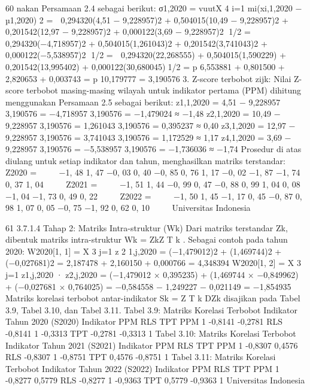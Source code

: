 60
nakan Persamaan 2.4 sebagai berikut:
σ1,2020 =
vuutX
4
i=1
mi(xi,1,2020 − µ1,2020)
2
=

0,294320(4,51 − 9,228957)2 + 0,504015(10,49 − 9,228957)2
+ 0,201542(12,97 − 9,228957)2 + 0,000122(3,69 − 9,228957)2
1/2
=

0,294320(−4,718957)2 + 0,504015(1,261043)2
+ 0,201542(3,741043)2 + 0,000122(−5,538957)2
1/2
=

0,294320(22,268555) + 0,504015(1,590229)
+ 0,201542(13,995402) + 0,000122(30,680045)1/2
=
p
6,553881 + 0,801500 + 2,820653 + 0,003743
=
p
10,179777 = 3,190576
3. Z-score terbobot zijk:
Nilai Z-score terbobot masing-masing wilayah untuk indikator pertama (PPM)
dihitung menggunakan Persamaan 2.5 sebagai berikut:
z1,1,2020 =
4,51 − 9,228957
3,190576
=
−4,718957
3,190576
= −1,479024 ≈ −1,48
z2,1,2020 =
10,49 − 9,228957
3,190576
=
1,261043
3,190576
= 0,395237 ≈ 0,40
z3,1,2020 =
12,97 − 9,228957
3,190576
=
3,741043
3,190576
= 1,172529 ≈ 1,17
z4,1,2020 =
3,69 − 9,228957
3,190576
=
−5,538957
3,190576
= −1,736036 ≈ −1,74
Prosedur di atas diulang untuk setiap indikator dan tahun, menghasilkan matriks terstandar:
Z2020 =


−1, 48 1, 47 −0, 03
0, 40 −0, 85 0, 76
1, 17 −0, 02 −1, 87
−1, 74 0, 37 1, 04


Z2021 =


−1, 51 1, 44 −0, 99
0, 47 −0, 88 0, 99
1, 04 0, 08 −1, 04
−1, 73 0, 49 0, 22


Z2022 =


−1, 50 1, 45 −1, 17
0, 45 −0, 87 0, 98
1, 07 0, 05 −0, 75
−1, 92 0, 62 0, 10


Universitas Indonesia

61
3.7.1.4 Tahap 2: Matriks Intra-struktur (Wk)
Dari matriks terstandar Zk, dibentuk matriks intra-struktur Wk = ZkZ
T
k
. Sebagai
contoh pada tahun 2020:
W2020[1, 1] = X
3
j=1
z
2
1,j,2020
= (−1,479012)2 + (1,469744)2 + (−0,027681)2
= 2,187478 + 2,160150 + 0,000766
= 4,348394
W2020[1, 2] = X
3
j=1
z1,j,2020 · z2,j,2020
= (−1,479012 × 0,395235) + (1,469744 × −0,849962)
+ (−0,027681 × 0,764025)
= −0,584558 − 1,249227 − 0,021149 = −1,854935
Matriks korelasi terbobot antar-indikator Sk = Z
T
k DZk disajikan pada Tabel 3.9,
Tabel 3.10, dan Tabel 3.11.
Tabel 3.9: Matriks Korelasi Terbobot Indikator Tahun 2020 (S2020)
Indikator PPM RLS TPT
PPM 1 -0,8141 -0,2781
RLS -0,8141 1 -0,3313
TPT -0,2781 -0,3313 1
Tabel 3.10: Matriks Korelasi Terbobot Indikator Tahun 2021 (S2021)
Indikator PPM RLS TPT
PPM 1 -0,8307 0,4576
RLS -0,8307 1 -0,8751
TPT 0,4576 -0,8751 1
Tabel 3.11: Matriks Korelasi Terbobot Indikator Tahun 2022 (S2022)
Indikator PPM RLS TPT
PPM 1 -0,8277 0,5779
RLS -0,8277 1 -0,9363
TPT 0,5779 -0,9363 1
Universitas Indonesia


